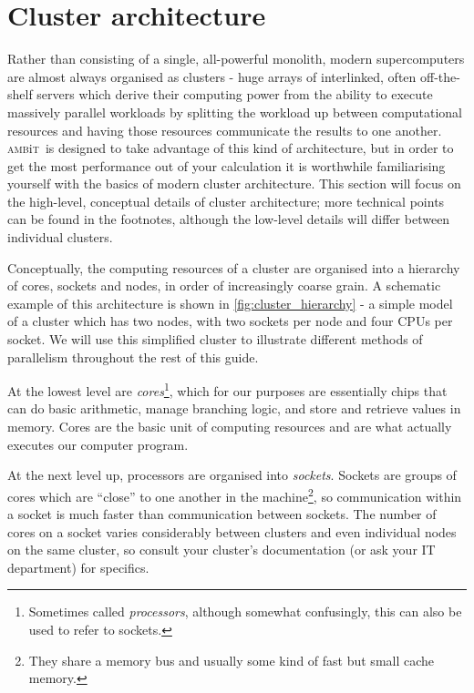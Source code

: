 \documentclass{report}
\newcommand{\ambit}{\textsc{amb}{\footnotesize i}\textsc{t}}
\begin{document}
\section{Cluster architecture}
\label{sec:cluster_architecture}

Rather than consisting of a single, all-powerful monolith, modern supercomputers are almost always
organised as clusters - huge arrays of interlinked, often off-the-shelf servers which derive their 
computing power from the ability to execute massively parallel workloads by splitting the workload up
between computational resources and having those resources communicate the results to one another. 
\ambit\ is designed to take advantage of this kind of architecture, but in order to get the most 
performance out of your calculation it is worthwhile familiarising yourself with the basics of modern 
cluster architecture. This section will focus on the high-level, conceptual details of cluster
architecture; more technical points can be found in the footnotes, although the low-level details will
differ between individual clusters.

Conceptually, the computing resources of a cluster are organised into a hierarchy of cores, sockets and
nodes, in order of increasingly coarse grain. A schematic example of this architecture is shown 
in \ref{fig:cluster_hierarchy} - a simple model of a cluster which has two nodes, with two sockets per 
node and four CPUs per socket. We will use this simplified cluster to illustrate different methods of
parallelism throughout the rest of this guide.

At the 
lowest level are \textit{cores}\footnote{Sometimes called \textit{processors}, although somewhat 
confusingly, this can also be used to refer to sockets.}, which for our purposes are essentially chips 
that can do basic arithmetic, manage branching logic, and store and retrieve values in memory. Cores are 
the basic unit of computing resources and are what actually executes our computer program. 

At the next level up, processors are organised into \textit{sockets}. Sockets are groups of cores which are
``close'' to one another in the machine\footnote{They share a memory bus and usually some kind of fast
but small cache memory.}, so
communication within a socket is much faster than communication between sockets. The number of cores on a
socket varies considerably between clusters and even individual nodes on the same cluster, so consult 
your cluster's documentation (or ask your IT department) for specifics.
\end{document}
